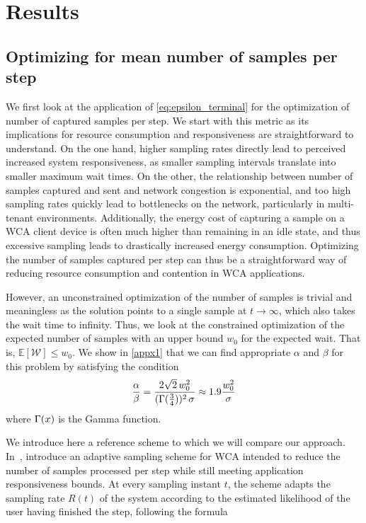 \section{Results}

\subsection{Optimizing for mean number of samples per step}\label{ssec:optimization:samples}

We first look at the application of \cref{eq:epsilon_terminal} for the optimization of number of captured samples per step.
We start with this metric as its implications for resource consumption and responsiveness are straightforward to understand.
On the one hand, higher sampling rates directly lead to perceived increased system responsiveness, as smaller sampling intervals translate into smaller maximum wait times.
On the other, the relationship between number of samples captured and sent and network congestion is exponential, and too high sampling rates quickly lead to bottlenecks on the network, particularly in multi-tenant environments.
Additionally, the energy cost of capturing a sample on a \gls{WCA} client device is often much higher than remaining in an idle state, and thus excessive sampling leads to drastically increased energy consumption.
Optimizing the number of samples captured per step can thus be a straightforward way of reducing resource consumption and contention in \gls{WCA} applications.

However, an unconstrained optimization of the number of samples is trivial and meaningless as the solution points to a single sample at $t\!\rightarrow\!\infty$, which also takes the wait time to infinity.
Thus, we look at the constrained optimization of the expected number of samples with an upper bound $w_0$ for the expected wait.
That is, $\mathbb{E}[\mathcal{W}]\!\leq\!w_0$.
We show in \cref{appx1} that we can find appropriate $\alpha$ and $\beta$ for this problem by satisfying the condition
\begin{alignat}{1}\label{eq:optimization:sampling}
\frac{\alpha}{\beta}=\frac{2\sqrt{2}\,w_0^2}{(\mathlarger{\Gamma}(\tfrac{3}{4}))^2\,\sigma}\approx1.9\frac{w_0^2}{\sigma}
\end{alignat}
where $\mathlarger{\Gamma}(x)$ is the Gamma function.

\medskip

We introduce here a reference scheme to which we will compare our approach.
In~\cite{wang2019towards}, \citeauthor{wang2019towards} introduce an adaptive sampling scheme for \gls{WCA} intended to reduce the number of samples processed per step while still meeting application responsiveness bounds.
At every sampling instant \( t \), the scheme adapts the sampling rate \( R(t) \) of the system according to the estimated likelihood of the user having finished the step,
following the formula 

